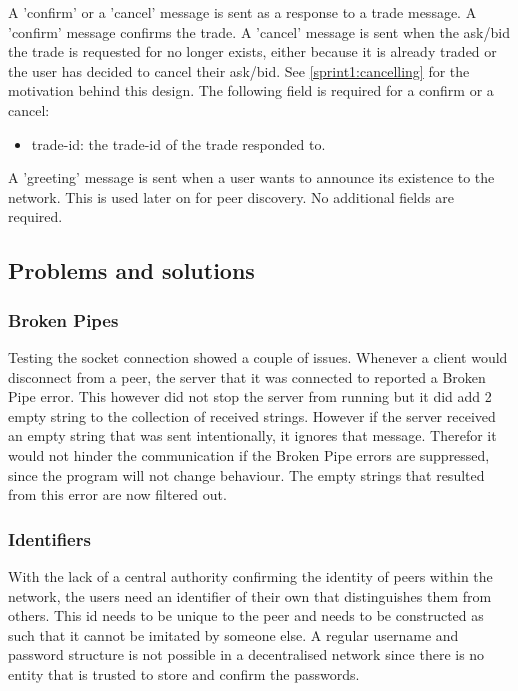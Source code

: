 \documentclass[]{article}
\newenvironment{myitemize}
{ \begin{itemize}
    \setlength{\itemsep}{0pt}
    \setlength{\parskip}{0pt}
    \setlength{\parsep}{0pt}     }
{ \end{itemize}                  }
\begin{document}
A 'confirm' or a 'cancel' message is sent as a response to a trade message.
A 'confirm' message confirms the trade.
A 'cancel' message is sent when the ask/bid the trade is requested for no longer exists, either because it is already traded or the user has decided to cancel their ask/bid.
See \ref{sprint1:cancelling} for the motivation behind this design.
The following field is required for a confirm or a cancel:
\begin{myitemize}
\item trade-id: the trade-id of the trade responded to.
\end{myitemize}

A 'greeting' message is sent when a user wants to announce its existence to the network.
This is used later on for peer discovery.
No additional fields are required.

\subsection{Problems and solutions}
\subsubsection{Broken Pipes}
Testing the socket connection showed a couple of issues.
Whenever a client would disconnect from a peer, the server that it was connected to reported a Broken Pipe error.
This however did not stop the server from running but it did add 2 empty string to the collection of received strings.
However if the server received an empty string that was sent intentionally, it ignores that message.
Therefor it would not hinder the communication if the Broken Pipe errors are suppressed, since the program will not change behaviour.
The empty strings that resulted from this error are now filtered out.

\subsubsection{Identifiers}
\label{sprint1:identifiers}
With the lack of a central authority confirming the identity of peers within the network, the users need an identifier of their own that distinguishes them from others.
This id needs to be unique to the peer and needs to be constructed as such that it cannot be imitated by someone else.
A regular username and password structure is not possible in a decentralised network since there is no entity that is trusted to store and confirm the passwords.
\end{document}
